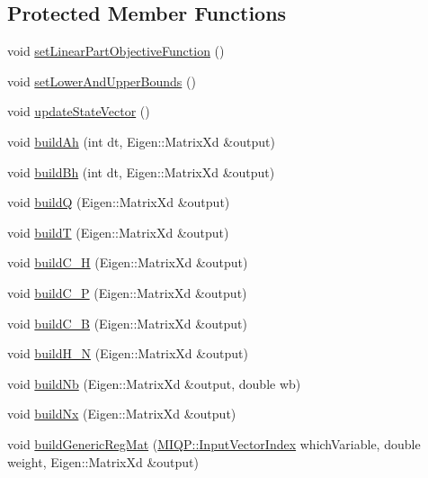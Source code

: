 \subsection*{\-Protected \-Member \-Functions}
\begin{DoxyCompactItemize}
\item 
void \hyperlink{classMIQPController_a2d882a4cd9e9832d8b9b2ad73111be0f}{set\-Linear\-Part\-Objective\-Function} ()
\item 
void \hyperlink{classMIQPController_a2caf42a5b5dcd63d67de57cfbb93c653}{set\-Lower\-And\-Upper\-Bounds} ()
\item 
void \hyperlink{classMIQPController_a8320465a1ec80d0cf7ba0d17652feba5}{update\-State\-Vector} ()
\item 
void \hyperlink{classMIQPController_aea16b6eac86da5330c7ffbfdb9c655f5}{build\-Ah} (int dt, \-Eigen\-::\-Matrix\-Xd \&output)
\item 
void \hyperlink{classMIQPController_afc2df705b1238e2503e35f07e2f8270a}{build\-Bh} (int dt, \-Eigen\-::\-Matrix\-Xd \&output)
\item 
void \hyperlink{classMIQPController_af492dfbff2e211ff1c1351c2193fe669}{build\-Q} (\-Eigen\-::\-Matrix\-Xd \&output)
\item 
void \hyperlink{classMIQPController_a52dc10cbc0941a6e4f4e6ffd462fffce}{build\-T} (\-Eigen\-::\-Matrix\-Xd \&output)
\item 
void \hyperlink{classMIQPController_aa58686fc2883ef2d81d3e6d3554b338d}{build\-C\-\_\-\-H} (\-Eigen\-::\-Matrix\-Xd \&output)
\item 
void \hyperlink{classMIQPController_ac2a454e236bdb3a13b72b6930329f231}{build\-C\-\_\-\-P} (\-Eigen\-::\-Matrix\-Xd \&output)
\item 
void \hyperlink{classMIQPController_a1be33f8ebb313f7ecddd2aa6af4fa62c}{build\-C\-\_\-\-B} (\-Eigen\-::\-Matrix\-Xd \&output)
\item 
void \hyperlink{classMIQPController_ab093df4b1c73c02a97609093fd037345}{build\-H\-\_\-\-N} (\-Eigen\-::\-Matrix\-Xd \&output)
\item 
void \hyperlink{classMIQPController_a8b83fba21208a3becff314d26ba45679}{build\-Nb} (\-Eigen\-::\-Matrix\-Xd \&output, double wb)
\item 
void \hyperlink{classMIQPController_a959d9957a931315d3f1cf95ad5c07a65}{build\-Nx} (\-Eigen\-::\-Matrix\-Xd \&output)
\item 
void \hyperlink{classMIQPController_ab8b3555a9f64417f2b986784c3ab8bd6}{build\-Generic\-Reg\-Mat} (\hyperlink{namespaceMIQP_a88adf7c800494cf6d751d065e642b45b}{\-M\-I\-Q\-P\-::\-Input\-Vector\-Index} which\-Variable, double weight, \-Eigen\-::\-Matrix\-Xd \&output)

\end{DoxyCompactItemize}
